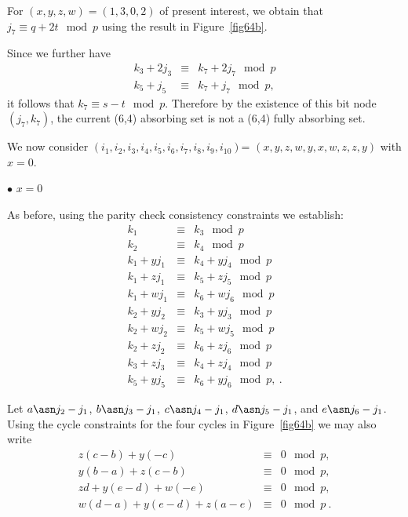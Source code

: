 For $(x,y,z,w)=(1,3,0,2)$ of present interest, we obtain that $j_7
\equiv q+2t \mod p$ using the result in Figure~\ref{fig64b}.

Since we further have
\begin{eqnarray*}
k_3+2j_3 &\equiv & k_7+2j_7 \mod p\\
k_5+j_5 & \equiv & k_7 +j_7 \mod p,
\end{eqnarray*}
it follows that $k_7 \equiv s-t \mod p$. Therefore by the existence
of this bit node $(j_7,k_7)$, the current (6,4) absorbing set is not
a (6,4) fully absorbing set.




 We now consider
$(i_1,i_2,i_3,i_4,i_5,i_6,i_7,i_8,i_9,i_{10})$=
$(x,y,z,w,y,x,w,z,z,y)$ with $x=0$. 

$\bullet$ $x=0$

As before, using the parity check consistency constraints we
establish:
\begin{equation}\label{eq11c}\begin{array}{cccc}
k_1 & \equiv & k_3 \mod p\\
k_2 & \equiv & k_4 \mod p\\
k_1+yj_1 & \equiv & k_4+yj_4 \mod p\\
k_1+zj_1 & \equiv & k_5+zj_5 \mod p\\
k_1+wj_1 & \equiv & k_6+wj_6 \mod p\\
k_2+yj_2 & \equiv & k_3+yj_3 \mod p\\
k_2+wj_2 & \equiv & k_5+wj_5 \mod p\\
k_2+zj_2 & \equiv & k_6+zj_6 \mod p\\
k_3+zj_3 & \equiv & k_4+zj_4 \mod p\\
k_5+yj_5 & \equiv & k_6+yj_6 \mod p,~.
\end{array}\end{equation}

Let $a \asn j_2 -j_1$, $b \asn j_3 -j_1$, $c \asn j_4 -j_1$, $d
\asn j_5 -j_1$, and $e \asn j_6 -j_1$. Using the cycle constraints
for the four cycles in Figure~\ref{fig64b} we may also write
\begin{equation}\label{eq11d}\begin{array}{cccc}
z(c-b)+y(-c) &\equiv & 0 \mod p, \\
y(b-a)+z(c-b)&\equiv & 0 \mod p, \\
zd+y(e-d)+w(-e) &\equiv & 0 \mod p, \\
w(d-a)+y(e-d)+z(a-e) &\equiv & 0 \mod p~.
\end{array}\end{equation}


